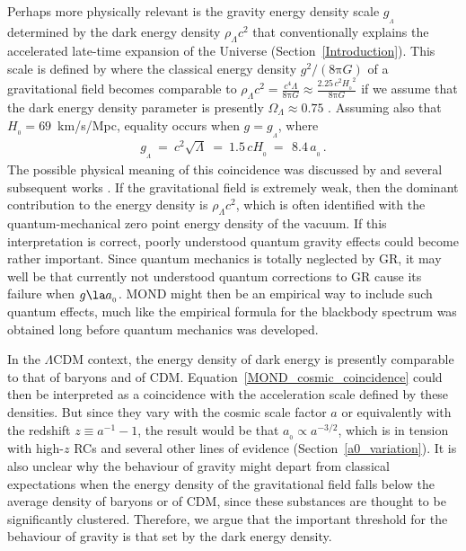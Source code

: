 \documentclass[fleqn,usenatbib,useAMS,onecolumn]{mnras} %
\begin{document}
Perhaps more physically relevant is the gravity energy density scale $g_{_\Lambda}$ determined by the dark energy density $\rho_{\Lambda} c^2$ that conventionally explains the accelerated late-time expansion of the Universe (Section~\ref{Introduction}). This scale is defined by where the classical energy density $g^2/\left(8 \mathrm{\pi} G \right)$ of a gravitational field \citep[equation~9 of][]{Peters_1981} becomes comparable to $\rho_{\Lambda} c^2 = \frac{c^4 \Lambda}{8 \mathrm{\pi} G} \approx \frac{2.25 \, c^2 {H_{_0}}^2}{8 \mathrm{\pi} G}$ if we assume that the dark energy density parameter is presently $\Omega_\Lambda \approx 0.75$ \citep{Planck_2016, Planck_2020}. Assuming also that $H_{_0} = 69$~km/s/Mpc, equality occurs when $g = g_{_\Lambda}$, where
\begin{eqnarray}
	g_{_\Lambda} ~=~ c^2 \sqrt{\Lambda} ~=~ 1.5 \, cH_{_0} ~=~ \, 8.4 \, a_{_0} \, .
	\label{MOND_cosmic_coincidence}
\end{eqnarray}
The possible physical meaning of this coincidence was discussed by \citet{Milgrom_1999} and several subsequent works \citep[e.g.][]{Pazy_2013, Verlinde_2017, Smolin_2017}. If the gravitational field is extremely weak, then the dominant contribution to the energy density is $\rho_{\Lambda}c^2$, which is often identified with the quantum-mechanical zero point energy density of the vacuum. If this interpretation is correct, poorly understood quantum gravity effects could become rather important. Since quantum mechanics is totally neglected by GR, it may well be that currently not understood quantum corrections to GR cause its failure when $g \la a_{_0}$. MOND might then be an empirical way to include such quantum effects, much like the empirical formula for the blackbody spectrum was obtained long before quantum mechanics was developed.

In the $\Lambda$CDM context, the energy density of dark energy is presently comparable to that of baryons and of CDM. Equation~\ref{MOND_cosmic_coincidence} could then be interpreted as a coincidence with the acceleration scale defined by these densities. But since they vary with the cosmic scale factor $a$ or equivalently with the redshift $z \equiv a^{-1} - 1$, the result would be that $a_{_0} \propto a^{-3/2}$, which is in tension with high-$z$ RCs \citep{Milgrom_2017} and several other lines of evidence (Section~\ref{a0_variation}). It is also unclear why the behaviour of gravity might depart from classical expectations when the energy density of the gravitational field falls below the average density of baryons or of CDM, since these substances are thought to be significantly clustered. Therefore, we argue that the important threshold for the behaviour of gravity is that set by the dark energy density.
\end{document}
